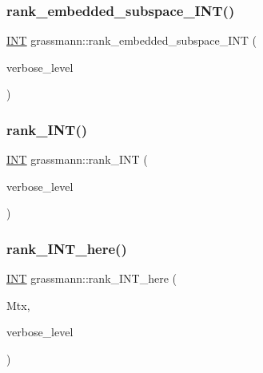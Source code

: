 \mbox{\label{classgrassmann_a97eaf2d9324f71cbdfa09b67aaaaf6c1}} 
\subsubsection{\texorpdfstring{rank\+\_\+embedded\+\_\+subspace\+\_\+\+I\+N\+T()}{rank\_embedded\_subspace\_INT()}}
{\footnotesize\ttfamily \mbox{\hyperlink{galois_8h_a09fddde158a3a20bd2dcadb609de11dc}{I\+NT}} grassmann\+::rank\+\_\+embedded\+\_\+subspace\+\_\+\+I\+NT (\begin{DoxyParamCaption}\item[{\mbox{\hyperlink{galois_8h_a09fddde158a3a20bd2dcadb609de11dc}{I\+NT}}}]{verbose\+\_\+level }\end{DoxyParamCaption})}

\mbox{\label{classgrassmann_a1fa95ce7ecebd48b04c7a0dc75491184}} 
\subsubsection{\texorpdfstring{rank\+\_\+\+I\+N\+T()}{rank\_INT()}}
{\footnotesize\ttfamily \mbox{\hyperlink{galois_8h_a09fddde158a3a20bd2dcadb609de11dc}{I\+NT}} grassmann\+::rank\+\_\+\+I\+NT (\begin{DoxyParamCaption}\item[{\mbox{\hyperlink{galois_8h_a09fddde158a3a20bd2dcadb609de11dc}{I\+NT}}}]{verbose\+\_\+level }\end{DoxyParamCaption})}

\mbox{\label{classgrassmann_aaeab144aec85ec523f5a4d614a86d8d7}} 
\subsubsection{\texorpdfstring{rank\+\_\+\+I\+N\+T\+\_\+here()}{rank\_INT\_here()}}
{\footnotesize\ttfamily \mbox{\hyperlink{galois_8h_a09fddde158a3a20bd2dcadb609de11dc}{I\+NT}} grassmann\+::rank\+\_\+\+I\+N\+T\+\_\+here (\begin{DoxyParamCaption}\item[{\mbox{\hyperlink{galois_8h_a09fddde158a3a20bd2dcadb609de11dc}{I\+NT}} $\ast$}]{Mtx,  }\item[{\mbox{\hyperlink{galois_8h_a09fddde158a3a20bd2dcadb609de11dc}{I\+NT}}}]{verbose\+\_\+level }\end{DoxyParamCaption})}

